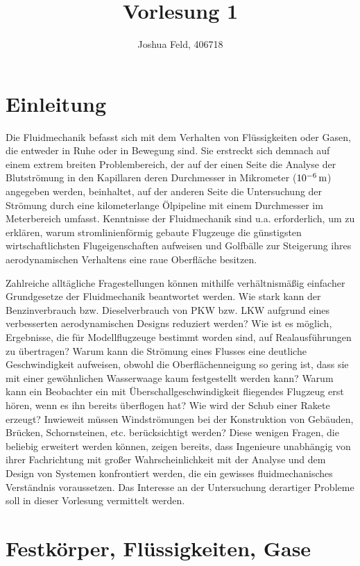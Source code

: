 \documentclass{lecture}
\institute{Lehrstuhl für Strömungslehre und Aerodynamisches Institut}
\title{Vorlesung 1}
\author{Joshua Feld, 406718}
\begin{document}
    \maketitle


    \section*{Einleitung}

    Die Fluidmechanik befasst sich mit dem Verhalten von Flüssigkeiten oder Gasen, die entweder in Ruhe oder in Bewegung sind.
    Sie erstreckt sich demnach auf einem extrem breiten Problembereich, der auf der einen Seite die Analyse der Blutströmung in den Kapillaren deren Durchmesser in Mikrometer (\(10^{-6}\,\si{\meter}\)) angegeben werden, beinhaltet, auf der anderen Seite die Untersuchung der Strömung durch eine kilometerlange Ölpipeline mit einem Durchmesser im Meterbereich umfasst.
    Kenntnisse der Fluidmechanik sind u.a. erforderlich, um zu erklären, warum stromlinienförmig gebaute Flugzeuge die günstigsten wirtschaftlichsten Flugeigenschaften aufweisen und Golfbälle zur Steigerung ihres aerodynamischen Verhaltens eine raue Oberfläche besitzen.

    Zahlreiche alltägliche Fragestellungen können mithilfe verhältnismäßig einfacher Grundgesetze der Fluidmechanik beantwortet werden.
    Wie stark kann der Benzinverbrauch bzw. Dieselverbrauch von PKW bzw. LKW aufgrund eines verbesserten aerodynamischen Designs reduziert werden?
    Wie ist es möglich, Ergebnisse, die für Modellflugzeuge bestimmt worden sind, auf Realausführungen zu übertragen?
    Warum kann die Strömung eines Flusses eine deutliche Geschwindigkeit aufweisen, obwohl die Oberflächenneigung so gering ist, dass sie mit einer gewöhnlichen Wasserwaage kaum festgestellt werden kann?
    Warum kann ein Beobachter ein mit Überschallgeschwindigkeit fliegendes Flugzeug erst hören, wenn es ihn bereits überflogen hat?
    Wie wird der Schub einer Rakete erzeugt?
    Inwieweit müssen Windströmungen bei der Konstruktion von Gebäuden, Brücken, Schornsteinen, etc. berücksichtigt werden?
    Diese wenigen Fragen, die beliebig erweitert werden können, zeigen bereits, dass Ingenieure unabhängig von ihrer Fachrichtung mit großer Wahrscheinlichkeit mit der Analyse und dem Design von Systemen konfrontiert werden, die ein gewisses fluidmechanisches Verständnis voraussetzen.
    Das Interesse an der Untersuchung derartiger Probleme soll in dieser Vorlesung vermittelt werden.


    \section*{Festkörper, Flüssigkeiten, Gase}
\end{document}

